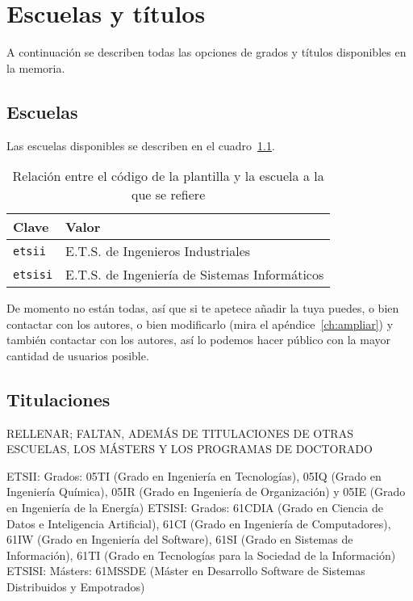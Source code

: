 \chapter{Escuelas y títulos}
\label{ch:escuelas-y-titulos}

A continuación se describen todas las opciones de grados y títulos disponibles en la memoria.

\section{Escuelas}

Las escuelas disponibles se describen en el cuadro~\ref{tbl:schools}.

\begin{table}[h]
    \centering
    \begin{tabular}{@{}ll@{}}
        \toprule
        \textbf{Clave}  & \textbf{Valor} \\
        \midrule
        \texttt{etsii}  & E.T.S. de Ingenieros Industriales \\
        \texttt{etsisi} & E.T.S. de Ingeniería de Sistemas Informáticos \\
        \bottomrule
    \end{tabular}
    \caption{\label{tbl:schools} Relación entre el código de la plantilla y la escuela a la que se refiere}
\end{table}

De momento no están todas, así que si te apetece añadir la tuya puedes, o bien contactar con los autores, o bien modificarlo (mira el apéndice~\ref{ch:ampliar}) y también contactar con los autores, así lo podemos hacer público con la mayor cantidad de usuarios posible.

\section{Titulaciones}

RELLENAR; FALTAN, ADEMÁS DE TITULACIONES DE OTRAS ESCUELAS, LOS MÁSTERS Y LOS PROGRAMAS DE DOCTORADO

ETSII: Grados: 05TI (Grado en Ingeniería en Tecnologías), 05IQ (Grado en Ingeniería Química), 05IR (Grado en Ingeniería de Organización) y 05IE (Grado en Ingeniería de la Energía)
ETSISI: Grados: 61CDIA (Grado en Ciencia de Datos e Inteligencia Artificial), 61CI (Grado en Ingeniería de Computadores), 61IW (Grado en Ingeniería del Software), 61SI (Grado en Sistemas de Información), 61TI (Grado en Tecnologías para la Sociedad de la Información)
ETSISI: Másters: 61MSSDE (Máster en Desarrollo Software de Sistemas Distribuidos y Empotrados)

